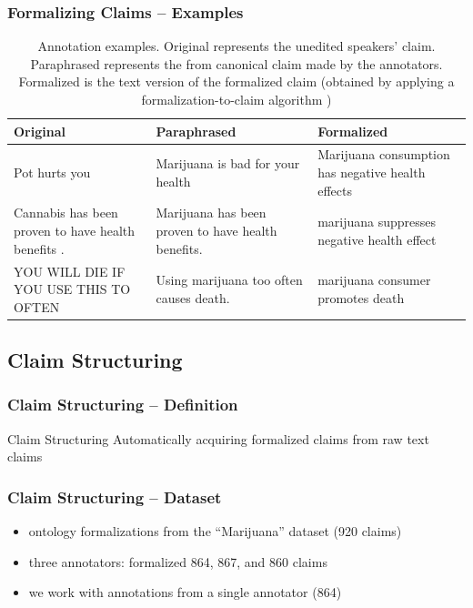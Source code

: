\documentclass{beamer}
\begin{document}
\begin{frame}
\frametitle{Formalizing Claims -- Examples}

\begin{table}[t]

\renewcommand{\arraystretch}{1.5} %
	\scriptsize
	\begin{tabular}{p{3cm}|p{3.5cm}|p{3.5cm}}
	\toprule
Original & Paraphrased & Formalized \\
\midrule
Pot hurts you & Marijuana is bad for your health & Marijuana consumption has negative health effects \\

Cannabis has been proven to have health benefits . & 
Marijuana has been proven to have health benefits. & 
marijuana suppresses negative health effect \\

YOU WILL DIE IF YOU USE THIS TO OFTEN &                                                                     
Using marijuana too often causes death. &                                                                                                                                                     
marijuana consumer promotes death \\                                                         
\bottomrule
\end{tabular}
\caption{Annotation examples. Original represents the unedited speakers' claim.
	Paraphrased represents the from canonical claim made by the annotators.
	Formalized is the text version  of the formalized claim (obtained by
	applying a formalization-to-claim algorithm )
	}
\end{table}

\end{frame}

\subsection{Claim Structuring}

\begin{frame}
\frametitle{Claim Structuring -- Definition}

\begin{block}{Claim Structuring}
Automatically acquiring formalized claims from raw text claims
\end{block}

\end{frame}

\begin{frame}
	\frametitle{Claim Structuring -- Dataset}

	\begin{itemize}
		\item ontology formalizations from the ``Marijuana'' dataset (920 claims)
		\item three annotators: formalized 864, 867, and 860 claims
		\item we work with annotations from a single annotator (864)
	\end{itemize}
\end{frame}
\end{document}

